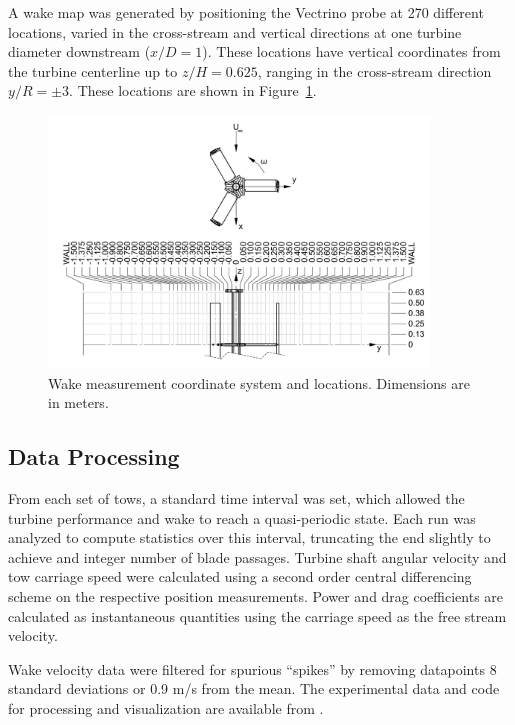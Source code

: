 \documentclass[energies,article,accept,moreauthors,pdftex,12pt,a4paper]{mdpi}
\begin{document}
A wake map was generated by positioning the Vectrino probe at 270 different
locations, varied in the cross-stream and vertical directions at one turbine
diameter downstream ($x/D=1$). These locations have vertical coordinates from
the turbine centerline up to $z/H=0.625$, ranging in the cross-stream direction
$y/R = \pm 3$. These locations are shown in Figure~\ref{fig:wake-locations}.

\begin{figure}
\centering
\includegraphics[width=0.9\textwidth]{figures/turbine_coordinate_system}
\caption{Wake measurement coordinate system and locations. Dimensions are in
meters.} 
\label{fig:wake-locations}
\end{figure}

\subsection{Data Processing}

From each set of tows, a standard time interval was set, which allowed the
turbine performance and wake to reach a quasi-periodic state. Each run was
analyzed to compute statistics over this interval, truncating the end slightly
to achieve and integer number of blade passages. Turbine shaft angular velocity
and tow carriage speed were calculated using a second order central differencing
scheme on the respective position measurements. Power and drag coefficients are
calculated as instantaneous quantities using the carriage speed as the free
stream velocity. 

Wake velocity data were filtered for spurious ``spikes'' by removing datapoints
8 standard deviations or 0.9 m/s from the mean. The experimental data and code
for processing and visualization are available from
\cite{Bachant2015-RVAT-Re-dep-data}.
\end{document}

